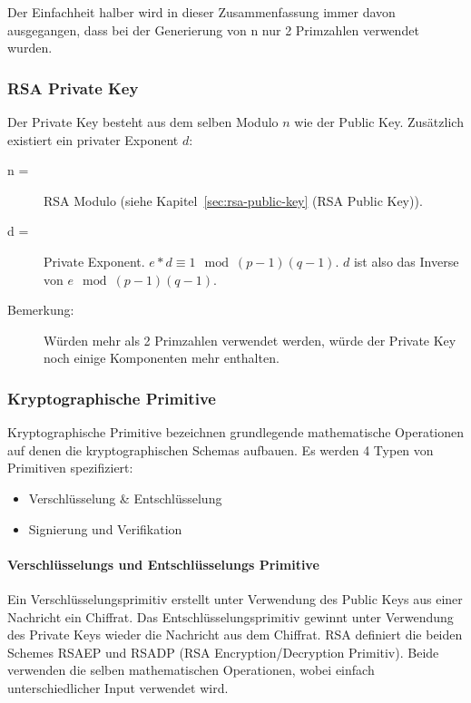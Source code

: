 \documentclass[10pt,a4paper]{article}
\begin{document}
Der Einfachheit halber wird in dieser Zusammenfassung immer davon ausgegangen, dass bei
der Generierung von n nur 2 Primzahlen verwendet wurden.

\subsubsection{RSA Private Key}
Der Private Key besteht aus dem selben Modulo $n$ wie der Public Key. Zusätzlich existiert
ein privater Exponent $d$:

\begin{description}
    \item[n =] RSA Modulo (siehe Kapitel~\ref{sec:rsa-public-key} (RSA Public Key)).
    \item[d =] Private Exponent. $e * d \equiv 1 \mod (p - 1)(q - 1)$. $d$ ist also das
        Inverse von $e \mod (p - 1)(q - 1)$.
\end{description}

\begin{description}
    \item[Bemerkung:] Würden mehr als 2 Primzahlen verwendet werden, würde der Private Key
        noch einige Komponenten mehr enthalten.
\end{description}

\subsubsection{Kryptographische Primitive}
Kryptographische Primitive bezeichnen grundlegende mathematische Operationen auf denen die
kryptographischen Schemas aufbauen. Es werden 4 Typen von Primitiven spezifiziert:
\begin{itemize}
    \item Verschlüsselung \& Entschlüsselung
    \item Signierung und Verifikation
\end{itemize}

\paragraph{Verschlüsselungs und Entschlüsselungs Primitive}
Ein Verschlüsselungsprimitiv erstellt unter Verwendung des Public Keys aus einer Nachricht
ein Chiffrat. Das Entschlüsselungsprimitiv gewinnt unter Verwendung des Private Keys
wieder die Nachricht aus dem Chiffrat.  RSA definiert die beiden Schemes RSAEP und RSADP
(RSA Encryption/Decryption Primitiv).  Beide verwenden die selben mathematischen
Operationen, wobei einfach unterschiedlicher Input verwendet wird.
\end{document}
